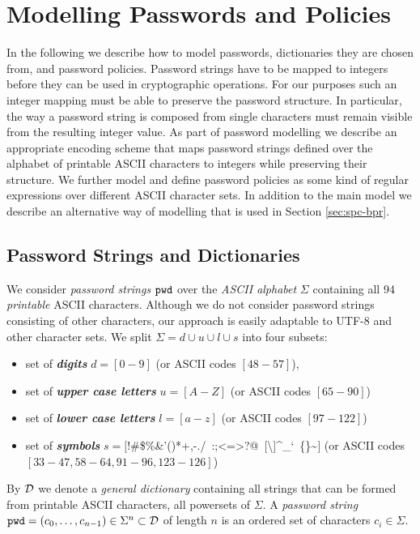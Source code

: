\section{Modelling Passwords and Policies} \label{sec:passwords}

In the following we describe how to model passwords, dictionaries they are chosen from, and password policies. 
Password strings have to be mapped to integers before they can be used in cryptographic operations. 
For our purposes such an integer mapping must be able to preserve the password structure. 
In particular, the way a password string is composed from single characters must remain visible from the resulting integer value. 
As part of password modelling we describe an appropriate encoding scheme that maps password strings defined over the alphabet of printable \ac{ASCII} characters to integers while preserving their structure. 
We further model and define password policies as some kind of regular expressions over different \ac{ASCII} character sets.
In addition to the main model we describe an alternative way of modelling that is used in Section \ref{sec:spc-bpr}.

\subsection{Password Strings and Dictionaries}
We consider \emph{password strings} $\mathtt{pwd}$ over the \emph{\ac{ASCII}  alphabet} $\Sigma$ containing all 94 \emph{printable} \ac{ASCII}  characters.
Although we do not consider password strings consisting of other characters, our approach is easily adaptable to \ac{UTF-8} and other character sets.
We split $\Sigma=d\cup u\cup l\cup s$ into four subsets:
\begin{itemize}
	\item set of \emph{\bf digits} $d=[0-9]$ (or \ac{ASCII}  codes $[48-57]$),
	\item set of \emph{\bf upper case letters} $u=[A-Z]$ (or \ac{ASCII}  codes $[65-90]$)
	\item set of \emph{\bf lower case letters} $l=[a-z]$ (or \ac{ASCII}  codes $[97-122]$)
	\item set of \emph{\bf symbols} $s=[$!\textquotedbl\#\$\%\&'()*+,-./~:;\textless=\textgreater?@~[\textbackslash]\^{}\_`~\{\textbar\}\textasciitilde$]$ (or \ac{ASCII}  codes $[33-47,58-64,91-96,123-126]$)
\end{itemize}

\noindent
By $\mathcal{D}$ we denote a \emph{general dictionary} containing all strings that can be formed from printable \ac{ASCII} characters, \ie all powersets of $\Sigma$.
A \emph{password string} $\mathtt{pwd}=(c_{0},\dots,c_{n-1})\in\Sigma^n\subset\mathcal{D}$ of length $n$ is an ordered set of characters $c_i\in\Sigma$.

